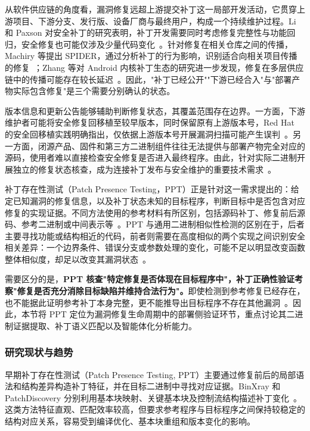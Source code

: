 从软件供应链的角度看，漏洞修复远超上游提交补丁这一局部开发活动，它贯穿上游项目、下游分支、发行版、设备厂商与最终用户，构成一个持续维护过程。Li 和 Paxson 对安全补丁的研究表明，补丁开发需要同时考虑修复完整性与功能回归，安全修复也可能仅涉及少量代码变化~\cite{li2017largescale}。针对修复在相关仓库之间的传播，Machiry 等提出 SPIDER，通过分析补丁的行为影响，识别适合向相关项目传播的修复~\cite{machiry2020spider}；Zhang 等对 Android 内核补丁生态的研究进一步发现，修复在多层供应链中的传播可能存在较长延迟~\cite{zhang2021android}。因此，"补丁已经公开""下游已经合入"与"部署产物实际包含修复"是三个需要分别确认的状态。

版本信息和更新公告能够辅助判断修复状态，其覆盖范围存在边界。一方面，下游维护者可能将安全修复回移植至较早版本，同时保留原有上游版本号，Red Hat 的安全回移植实践明确指出，仅依据上游版本号开展漏洞扫描可能产生误判~\cite{redhatbackporting}。另一方面，闭源产品、固件和第三方二进制组件往往无法提供与部署产物完全对应的源码，使用者难以直接检查安全修复是否进入最终程序。由此，针对实际二进制开展独立的修复状态核查，成为连接补丁发布与安全维护的重要技术需求~\cite{fiber}。

补丁存在性测试（Patch Presence Testing，PPT）正是针对这一需求提出的：给定已知漏洞的修复信息，以及补丁状态未知的目标程序，判断目标中是否包含对应修复的实现证据。不同方法使用的参考材料有所区别，包括源码补丁、修复前后源码、参考二进制或中间表示等~\cite{fiber,binxray}。PPT 与通用二进制相似性检测的区别在于，后者主要寻找功能或结构相近的代码，前者则需要在高度相似的两个实现之间识别安全相关差异：一个边界条件、错误分支或参数处理的变化，可能不足以明显改变函数整体相似度，却足以改变其漏洞状态~\cite{binxray}。

需要区分的是，\textbf{PPT 核查"特定修复是否体现在目标程序中"，补丁正确性验证考察"修复是否充分消除目标缺陷并维持合法行为"。}即使检测到参考修复已经存在，也不能据此证明参考补丁本身完整，更不能推导出目标程序不存在其他漏洞~\cite{sokavr,li2017largescale,fiber}。因此，本节将 PPT 定位为漏洞修复生命周期中的部署侧验证环节，重点讨论其二进制证据提取、补丁语义匹配以及智能体化分析能力。

\subsubsection{研究现状与趋势}

早期补丁存在性测试（Patch Presence Testing, PPT）主要通过修复前后的局部语法和结构差异构造补丁特征，并在目标二进制中寻找对应证据。BinXray 和 PatchDiscovery 分别利用基本块映射、关键基本块及控制流结构描述补丁变化~\cite{binxray,patchdiscovery}。这类方法特征直观、匹配效率较高，但要求参考程序与目标程序之间保持较稳定的结构对应关系，容易受到编译优化、基本块重组和版本变化的影响。


